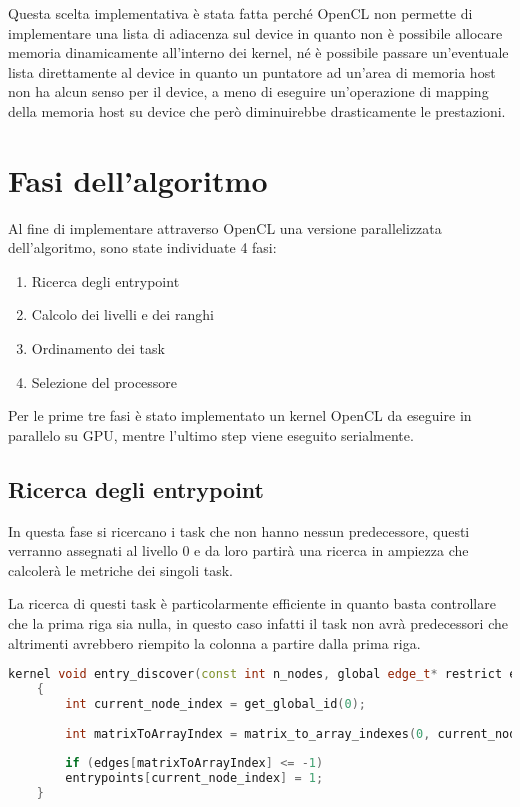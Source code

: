 Questa scelta implementativa è stata fatta perché OpenCL non permette di implementare una lista di adiacenza sul device in quanto non è possibile allocare memoria dinamicamente all'interno dei kernel, né è possibile passare un'eventuale lista direttamente al device in quanto un puntatore ad un'area di memoria host non ha alcun senso per il device, a meno di eseguire un'operazione di mapping della memoria host su device che però diminuirebbe drasticamente le prestazioni.


\section{Fasi dell'algoritmo}
Al fine di implementare attraverso OpenCL una versione parallelizzata dell'algoritmo, sono state individuate 4 fasi:

\begin{enumerate}
	\item Ricerca degli entrypoint
	\item Calcolo dei livelli e dei ranghi
	\item Ordinamento dei task
	\item Selezione del processore
\end{enumerate}
Per le prime tre fasi è stato implementato un kernel OpenCL da eseguire in parallelo su GPU, mentre l'ultimo step viene eseguito serialmente.

\subsection{Ricerca degli entrypoint}
In questa fase si ricercano i task che non hanno nessun predecessore, questi verranno assegnati al livello 0 e da loro partirà una ricerca in ampiezza che calcolerà le metriche dei singoli task.

La ricerca di questi task è particolarmente efficiente in quanto basta controllare che la prima riga sia nulla, in questo caso infatti il task non avrà predecessori che altrimenti avrebbero riempito la colonna a partire dalla prima riga.

\begin{lstlisting}[language=C++, caption={Find entrypoints kernel},captionpos=b]
	kernel void entry_discover(const int n_nodes, global edge_t* restrict edges, volatile global int* n_entries, global int* entrypoints)
	{
		int current_node_index = get_global_id(0);
		
		int matrixToArrayIndex = matrix_to_array_indexes(0, current_node_index, n_nodes);
		
		if (edges[matrixToArrayIndex] <= -1)
		entrypoints[current_node_index] = 1;
	}
\end{lstlisting}

